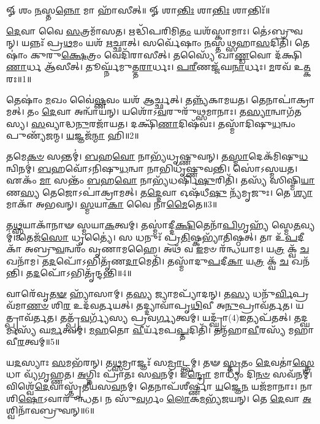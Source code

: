 \setcounter{anuvakam}{0}

𑍐 𑌶𑌂 \ul{𑌨}\-𑌸𑍍𑌤\-\ul{𑌨𑍍𑌨𑍋} 𑌮𑌾 𑌹𑌾᳴𑌸𑍀𑌤𑍍॥ 𑍐 𑌶𑌾\-\ul{𑌨𑍍𑌤𑌿𑌃} 𑌶𑌾\-\ul{𑌨𑍍𑌤𑌿𑌃} 𑌶𑌾𑌨𑍍𑌤𑌿𑌃᳴॥

\-\ul{𑌦𑍇}\-𑌵𑌾 𑌵𑍈 \ul{𑌸}\-𑌤𑍍𑌰𑌮𑌾᳴𑌸𑌤। 
𑌋𑌦𑍍𑌧𑌿᳴𑌪𑌰𑌿𑌮𑌿\-\ul{𑌤𑌂} 𑌯𑌶᳴𑌸𑍍𑌕𑌾𑌮𑌾𑌃। 
𑌤𑍇॑𑌽𑌬𑍍𑌰𑍁𑌵𑌨𑍍। 
𑌯𑌨𑍍𑌨𑌃᳴ 𑌪𑍍𑌰\-\ul{𑌥}\-𑌮𑌂 𑌯𑌶᳴ \ul{𑌋}\-𑌚𑍍𑌛𑌾𑌤𑍍। 
𑌸𑌰𑍍𑌵𑍇᳴𑌷𑌾𑌂 \ul{𑌨}\-𑌸𑍍𑌤\-\ul{𑌥𑍍𑌸}\-𑌹𑌾\-\ul{𑌸}\-𑌦𑌿𑌤𑌿᳴। 
𑌤𑍇𑌷𑌾𑌂॑ 𑌕𑍁𑌰𑍁\-\ul{𑌕𑍍𑌷𑍇}\-𑌤𑍍𑌰𑌂 𑌵𑍇𑌦𑌿᳴𑌰𑌾𑌸𑍀𑌤𑍍। 
𑌤𑌸𑍍𑌯𑍈᳴ 𑌖𑌾\-\ul{𑌣𑍍𑌡}\-𑌵𑍋 𑌦᳴𑌕𑍍𑌷𑌿\-\ul{𑌣𑌾}\-𑌰𑍍𑌧 𑌆᳴𑌸𑍀𑌤𑍍। 
𑌤𑍂𑌰𑍍𑌘𑍍𑌨᳴𑌮𑍁𑌤𑍍𑌤\-\ul{𑌰𑌾}\-𑌰𑍍𑌧𑌃। 
\-\ul{𑌪}\-\-\ul{𑌰𑍀}\-𑌣𑌜𑍍𑌜᳴𑌘\-\ul{𑌨𑌾}\-𑌰𑍍𑌧𑌃। 
\-\ul{𑌮}\-𑌰𑌵᳴ 𑌉\-\ul{𑌤𑍍𑌕}\-𑌰𑌃॥1॥

𑌤𑍇𑌷𑌾𑌂॑ \ul{𑌮}\-𑌖𑌂 𑌵𑍈॑\-\ul{𑌷𑍍𑌣}\-𑌵𑌂 𑌯𑌶᳴ 𑌆𑌰𑍍𑌚𑍍𑌛𑌤𑍍। 
𑌤𑌨𑍍𑌨𑍍𑌯᳴𑌕𑌾𑌮𑌯𑌤। 
𑌤𑍇𑌨𑌾𑌪𑌾॑𑌕𑍍𑌰𑌾𑌮𑌤𑍍। 
𑌤𑌂 \ul{𑌦𑍇}\-𑌵𑌾 𑌅𑌨𑍍𑌵𑌾᳴𑌯𑌨𑍍। 
𑌯𑌶𑍋᳴𑌽\-\ul{𑌵}\-𑌰𑍁𑌰𑍁᳴𑌥𑍍𑌸𑌮𑌾𑌨𑌾𑌃। 
𑌤\-\ul{𑌸𑍍𑌯𑌾}\-𑌨𑍍𑌵𑌾𑌗᳴𑌤𑌸𑍍𑌯। 
\-\ul{𑌸}\-𑌵𑍍𑌯𑌾𑌦𑍍𑌧\-\ul{𑌨𑍁}\-𑌰𑌜𑌾᳴𑌯𑌤। 
𑌦𑌕𑍍𑌷𑌿᳴\-\ul{𑌣𑌾}\-𑌦𑌿𑌷᳴𑌵𑌃। 
𑌤𑌸𑍍𑌮𑌾᳴𑌦𑌿𑌷𑍁\-\ul{𑌧}\-𑌨𑍍𑌵𑌂 𑌪𑍁𑌣𑍍𑌯᳴𑌜𑌨𑍍𑌮। 
\-\ul{𑌯}\-𑌜𑍍𑌞𑌜᳴\-\ul{𑌨𑍍𑌮𑌾} 𑌹𑌿॥2॥

𑌤𑌮𑍇\-\ul{𑌕}\-\-\ul{𑍞} 𑌸𑌨𑍍𑌤𑌮𑍍॑। 
\-\ul{𑌬}\-𑌹\-\ul{𑌵𑍋} 𑌨𑌾𑌭𑍍𑌯᳴𑌧𑍃𑌷𑍍𑌣𑍁𑌵𑌨𑍍। 
𑌤\-\ul{𑌸𑍍𑌮𑌾}\-𑌦𑍇𑌕᳴𑌮𑌿𑌷𑍁\-\ul{𑌧}\-𑌨𑍍𑌵𑌿\-𑌨𑌮𑍍॑। 
\-\ul{𑌬}\-𑌹𑌵𑍋᳴𑌽𑌨𑌿𑌷𑍁\-\ul{𑌧}\-𑌨𑍍𑌵𑌾 𑌨𑌾𑌭𑌿𑌧𑍃᳴𑌷𑍍𑌣𑍁𑌵𑌨𑍍𑌤𑌿। 
𑌸𑍋॑𑌽𑌸𑍍𑌮𑌯𑌤। 
𑌏𑌕𑌂᳴ \ul{𑌮𑌾} 𑌸𑌨𑍍𑌤𑌂᳴ \ul{𑌬}\-𑌹\-\ul{𑌵𑍋} 𑌨𑌾𑌭𑍍𑌯᳴𑌧𑌰𑍍\mbox{}𑌷𑌿\-\ul{𑌷𑍁}\-𑌰𑌿𑌤𑌿᳴। 
𑌤𑌸𑍍𑌯᳴ 𑌸𑌿𑌷𑍍𑌮𑌿\-\ul{𑌯𑌾}\-𑌣\-\ul{𑌸𑍍𑌯} 𑌤𑍇𑌜𑍋𑌽𑌪𑌾॑𑌕𑍍𑌰𑌾𑌮𑌤𑍍। 
𑌤\-\ul{𑌦𑍍𑌦𑍇}\-𑌵𑌾 𑌓𑌷᳴𑌧𑍀\-\ul{𑌷𑍁} 𑌨𑍍𑌯᳴𑌮𑍃𑌜𑍁𑌃। 
𑌤𑍇 \ul{𑌶𑍍𑌯𑌾}\-𑌮𑌾𑌕𑌾᳴ 𑌅𑌭𑌵𑌨𑍍। 
\-\ul{𑌸𑍍𑌮}\-𑌯𑌾\-\ul{𑌕𑌾} 𑌵𑍈 𑌨𑌾\-\ul{𑌮𑍈}\-𑌤𑍇॥3॥

𑌤\-\ul{𑌥𑍍𑌸𑍍𑌮}\-𑌯𑌾𑌕𑌾᳴𑌨𑌾𑍟 𑌸𑍍𑌮𑌯𑌾\-\ul{𑌕}\-𑌤𑍍𑌵𑌮𑍍। 
𑌤𑌸𑍍𑌮𑌾॑𑌦𑍍𑌦𑍀\-\ul{𑌕𑍍𑌷𑌿}\-𑌤𑍇𑌨𑌾᳴\-\ul{𑌪𑌿}\-𑌗𑍃𑌹𑍍𑌯᳴ 𑌸𑍍𑌮𑍇\-\ul{𑌤}\-𑌵𑍍𑌯𑌮𑍍॑। 
𑌤𑍇𑌜᳴\-\ul{𑌸𑍋} 𑌧𑍃𑌤𑍍𑌯𑍈॑। 
𑌸 𑌧𑌨𑍁𑌃᳴ 𑌪𑍍𑌰\-\ul{𑌤𑌿}\-𑌷𑍍𑌕𑌭𑍍𑌯𑌾᳴𑌤𑌿𑌷𑍍𑌠𑌤𑍍। 
𑌤𑌾 𑌉᳴\-\ul{𑌪}\-𑌦𑍀𑌕𑌾᳴ 𑌅𑌬𑍍𑌰𑍁\-\ul{𑌵}\-𑌨𑍍𑌵𑌰𑌂᳴ 𑌵𑍃𑌣𑌾𑌮𑌹𑍈। 
𑌅𑌥᳴ 𑌵 \ul{𑌇}\-𑌮𑍞 𑌰᳴𑌨𑍍𑌧𑌯𑌾𑌮। 
𑌯\-\ul{𑌤𑍍𑌰} 𑌕𑍍𑌵᳴ \ul{𑌚} 𑌖𑌨𑌾᳴𑌮। 
𑌤\-\ul{𑌦}\-𑌪𑍋᳴𑌽𑌭𑌿𑌤𑍃᳴𑌣\-\ul{𑌦𑌾}\-𑌮𑍇𑌤𑌿᳴। 
𑌤𑌸𑍍𑌮𑌾᳴𑌦𑍁\-\ul{𑌪}\-𑌦𑍀\-\ul{𑌕𑌾} 𑌯\-\ul{𑌤𑍍𑌰} 𑌕𑍍𑌵᳴ \ul{𑌚} 𑌖𑌨᳴𑌨𑍍𑌤𑌿। 
𑌤\-\ul{𑌦}\-𑌪𑍋᳴𑌽𑌭𑌿𑌤𑍃᳴𑌨𑍍𑌦𑌨𑍍𑌤𑌿॥4॥

𑌵𑌾𑌰𑍇᳴𑌵𑍃\-\ul{𑌤}\-\-\ul{𑍟} 𑌹𑍍𑌯𑌾᳴𑌸𑌾𑌮𑍍। 
𑌤\-\ul{𑌸𑍍𑌯} 𑌜𑍍𑌯𑌾𑌮𑌪𑍍𑌯𑌾᳴𑌦𑌨𑍍। 
𑌤\-\ul{𑌸𑍍𑌯} 𑌧𑌨𑍁᳴\-\ul{𑌰𑍍𑌵𑌿}\-𑌪𑍍𑌰𑌵᳴𑌮𑌾\-\ul{𑌣}\-\-\ul{𑍞} 𑌶𑌿\-\ul{𑌰} 𑌉𑌦᳴𑌵𑌰𑍍𑌤𑌯𑌤𑍍। 
𑌤𑌦𑍍𑌦𑍍𑌯𑌾𑌵𑌾᳴𑌪𑍃\-\ul{𑌥𑌿}\-𑌵𑍀 𑌅\-\ul{𑌨𑍁}\-𑌪𑍍𑌰𑌾𑌵᳴𑌰𑍍𑌤𑌤। 
𑌯𑌤𑍍𑌪𑍍𑌰𑌾𑌵᳴𑌰𑍍𑌤𑌤। 
𑌤𑌤𑍍𑌪𑍍𑌰᳴\-\ul{𑌵}\-𑌰𑍍𑌗𑍍𑌯᳴𑌸𑍍𑌯 𑌪𑍍𑌰𑌵\-\ul{𑌰𑍍𑌗𑍍𑌯}\-𑌤𑍍𑌵𑌮𑍍। 
𑌯𑌦𑍍𑌘𑍍𑌰𑌾𑌁(4)𑌇𑌤𑍍𑌯𑌪᳴𑌤𑌤𑍍। 
𑌤𑌦𑍍\mbox{}\-\ul{𑌘}\-𑌰𑍍𑌮𑌸𑍍𑌯᳴ 𑌘\-\ul{𑌰𑍍𑌮}\-𑌤𑍍𑌵𑌮𑍍। 
\-\ul{𑌮}\-\-\ul{𑌹}\-𑌤𑍋 \ul{𑌵𑍀}\-𑌰𑍍𑌯᳴𑌮𑌪\-\ul{𑌪𑍍𑌤}\-𑌦𑌿𑌤𑌿᳴। 
𑌤𑌨𑍍𑌮᳴𑌹𑌾\-\ul{𑌵𑍀}\-𑌰𑌸𑍍𑌯᳴ 𑌮𑌹𑌾𑌵𑍀\-\ul{𑌰}\-𑌤𑍍𑌵𑌮𑍍॥5॥

𑌯\-\ul{𑌦}\-𑌸𑍍𑌯𑌾𑌃 \ul{𑌸}\-𑌮𑌭᳴𑌰𑌨𑍍। 
𑌤\-\ul{𑌥𑍍𑌸}\-𑌮𑍍𑌰𑌾𑌜𑍍𑌞𑌃᳴ 𑌸\-\ul{𑌮𑍍𑌰𑌾}\-𑌟𑍍𑌤𑍍𑌵𑌮𑍍। 
𑌤𑍟 \ul{𑌸𑍍𑌤𑍃}\-𑌤𑌂 \ul{𑌦𑍇}\-𑌵𑌤𑌾॑\-\ul{𑌸𑍍𑌤𑍍𑌰𑍇}\-𑌧𑌾 𑌵𑍍𑌯᳴𑌗𑍃𑌹𑍍𑌣𑌤। 
\-\ul{𑌅}\-𑌗𑍍𑌨𑌿𑌃 𑌪𑍍𑌰𑌾᳴𑌤𑌃 𑌸\-\ul{𑌵}\-𑌨𑌮𑍍। 
𑌇\-\ul{𑌨𑍍𑌦𑍍𑌰𑍋} 𑌮𑌾𑌧𑍍𑌯𑌂᳴ 𑌦𑌿\-\ul{𑌨}\-\-\ul{𑍞} 𑌸𑌵᳴𑌨𑌮𑍍। 
𑌵𑌿𑌶𑍍𑌵𑍇᳴\-\ul{𑌦𑍇}\-𑌵𑌾𑌸𑍍𑌤𑍃᳴𑌤𑍀𑌯𑌸\-\ul{𑌵}\-𑌨𑌮𑍍। 
𑌤𑍇𑌨𑌾𑌪᳴𑌶𑍀𑌰𑍍𑌷𑍍𑌣𑌾 \ul{𑌯}\-𑌜𑍍𑌞𑍇\-\ul{𑌨} 𑌯𑌜᳴𑌮𑌾𑌨𑌾𑌃। 
𑌨𑌾𑌶𑌿\-\ul{𑌷𑍋}\-𑌽𑌵𑌾𑌰𑍁᳴𑌨𑍍𑌧𑌤। 
𑌨 𑌸𑍁᳴\-\ul{𑌵}\-𑌰𑍍𑌗𑌂 \ul{𑌲𑍋}\-𑌕\-\ul{𑌮}\-𑌭𑍍𑌯᳴𑌜𑌯𑌨𑍍। 
𑌤𑍇 \ul{𑌦𑍇}\-𑌵𑌾 \ul{𑌅}\-𑌶𑍍𑌵𑌿𑌨𑌾᳴𑌵𑌬𑍍𑌰𑍁𑌵𑌨𑍍॥6॥

